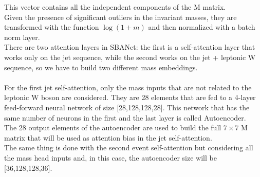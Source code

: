 This vector contains all the independent components of the M matrix.\\
Given the presence of significant outliers in the invariant masses, they are transformed with the function $\log(1+m)$ and then normalized with a batch norm layer.\\
There are two attention layers in SBANet: the first is a self-attention layer that works only on the jet sequence, while the second works on the jet + leptonic W sequence, so we have to build two different mass embeddings.\\
\\
For the first jet self-attention, only the mass inputs that are not related to the leptonic W boson are considered. They are 28 elements that are fed to a 4-layer feed-forward neural network of size [28,128,128,28]. This network that has the same number of neurons in the first and the last layer is called Autoencoder.\\
The 28 output elements of the autoencoder are used to build the full $7\times 7$ M matrix that will be used as attention bias in the jet self-attention.\\
The same thing is done with the second event self-attention but considering all the mass head inputs and, in this case, the autoencoder size will be [36,128,128,36].\\

